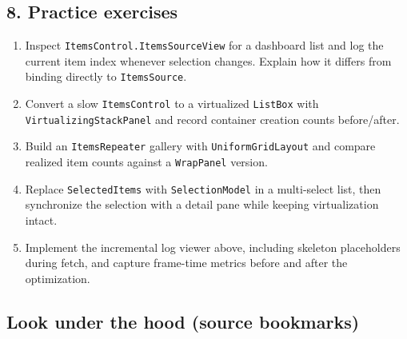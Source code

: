 \subsection{8. Practice exercises}\label{practice-exercises-8}

\begin{enumerate}
\def\labelenumi{\arabic{enumi}.}
\tightlist
\item
  Inspect \passthrough{\lstinline!ItemsControl.ItemsSourceView!} for a
  dashboard list and log the current item index whenever selection
  changes. Explain how it differs from binding directly to
  \passthrough{\lstinline!ItemsSource!}.
\item
  Convert a slow \passthrough{\lstinline!ItemsControl!} to a virtualized
  \passthrough{\lstinline!ListBox!} with
  \passthrough{\lstinline!VirtualizingStackPanel!} and record container
  creation counts before/after.
\item
  Build an \passthrough{\lstinline!ItemsRepeater!} gallery with
  \passthrough{\lstinline!UniformGridLayout!} and compare realized item
  counts against a \passthrough{\lstinline!WrapPanel!} version.
\item
  Replace \passthrough{\lstinline!SelectedItems!} with
  \passthrough{\lstinline!SelectionModel!} in a multi-select list, then
  synchronize the selection with a detail pane while keeping
  virtualization intact.
\item
  Implement the incremental log viewer above, including skeleton
  placeholders during fetch, and capture frame-time metrics before and
  after the optimization.
\end{enumerate}

\subsection{Look under the hood (source
bookmarks)}\label{look-under-the-hood-source-bookmarks-12}

